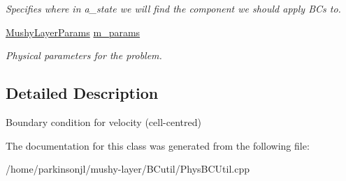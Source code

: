 \begin{DoxyCompactItemize}
\begin{DoxyCompactList}\small\item\em Specifies where in a\-\_\-state we will find the component we should apply B\-Cs to. \end{DoxyCompactList}\item 
\hypertarget{class_basic_c_c_vel_b_c_function_aefbcd5a114ca8e72723790c20feb1466}{\hyperlink{class_mushy_layer_params}{Mushy\-Layer\-Params} \hyperlink{class_basic_c_c_vel_b_c_function_aefbcd5a114ca8e72723790c20feb1466}{m\-\_\-params}}\label{class_basic_c_c_vel_b_c_function_aefbcd5a114ca8e72723790c20feb1466}

\begin{DoxyCompactList}\small\item\em Physical parameters for the problem. \end{DoxyCompactList}\end{DoxyCompactItemize}


\subsection{Detailed Description}
Boundary condition for velocity (cell-\/centred) 

The documentation for this class was generated from the following file\-:\begin{DoxyCompactItemize}
\item 
/home/parkinsonjl/mushy-\/layer/\-B\-Cutil/Phys\-B\-C\-Util.\-cpp\end{DoxyCompactItemize}
